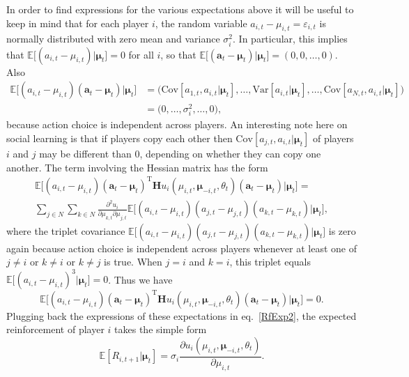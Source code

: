 \documentclass[11pt,reqno]{amsart}
\newcommand{\e}{\theta}
\newcommand{\ac}{a}
\newcommand{\va}{\mathbf{a}}
\newcommand{\Esp}{\mathds{E}}
\newcommand{\np}{N}%
\newcommand{\tm}{t}%
\newcommand{\pf}{u}
\newcommand{\ma}{\mu}
\newcommand{\sd}{\sigma}
\newcommand{\vma}{\boldsymbol{\ma}}
\newcommand{\rf}{R}
\newcommand{\pd}{\partial}
\newcommand{\Hs}{\mathbf{H}}
\newcommand{\var}{\mathrm{Var}}
\newcommand{\cov}{\mathrm{Cov}}
\begin{document}
In order to find expressions for the various expectations above it will be useful to keep in mind that for each player $i$, the random variable $\ac_{i,\tm}- \ma_{i,\tm}=\varepsilon_{i,t}$ is normally distributed with zero mean and variance $\sd_{i}^2$. In particular, this implies that $\Esp \Big[ (\ac_{i,\tm}- \ma_{i,\tm}) \Big| \vma_\tm \Big] = 0$ for all $i$, so that $\Esp \Big[ (\va_\tm  - \vma_\tm) \Big| \vma_\tm \Big] = (0, 0, \dots,0)$. Also
\begin{align}
\label{RfExp3}
\Esp \Big[ (\ac_{i,\tm}- \ma_{i,\tm}) (\va_\tm  - \vma_\tm) \Big| \vma_\tm \Big] & = \Big( \cov[\ac_{1,\tm},\ac_{i,\tm} | \vma_\tm],\dots,\var[\ac_{i,\tm}| \vma_\tm] ,\dots, \cov[\ac_{\np,\tm},\ac_{i,\tm}| \vma_\tm] \Big) \nonumber\\ 
 & = \Big( 0,\dots,\sd_{i}^2,\dots, 0 \Big),
\end{align}
because action choice is independent across players. An interesting note here on social learning is that if players copy each other then $\cov[\ac_{j,\tm},\ac_{i,\tm}| \vma_\tm]$ of players $i$ and $j$ may be different than 0, depending on whether they can copy one another. The term involving the Hessian matrix has the form
\begin{multline}
\label{RfExpH}
\Esp \Big[ (\ac_{i,\tm}- \ma_{i,\tm}) (\va_\tm  - \vma_\tm)^{\textrm{T}} \Hs \pf_{i}(\ma_{i,\tm},\vma_{-i,\tm},\e_\tm) (\va_\tm  - \vma_\tm) \Big| \vma_\tm \Big] = \\
 \sum_{j\in\np} \sum_{k\in\np} \frac{\pd^2 \pf_{i}}{\pd \ma_{k,\tm} \pd \ma_{j,\tm}} \Esp \Big[ (\ac_{i,\tm}- \ma_{i,\tm}) (\ac_{j,\tm}- \ma_{j,\tm}) (\ac_{k,\tm}- \ma_{k,\tm}) \Big| \vma_\tm \Big],
\end{multline}
where the triplet covariance $\Esp \Big[ (\ac_{i,\tm}- \ma_{i,\tm}) (\ac_{j,\tm}- \ma_{j,\tm}) (\ac_{k,\tm}- \ma_{k,\tm}) \Big| \vma_\tm \Big] $ is zero again because action choice is independent across players whenever at least one of  $j\neq i$ or $k\neq i$ or $k\neq j$ is true. When $j=i$ and $k=i$, this triplet equals $\Esp \Big[ (\ac_{i,\tm}- \ma_{i,\tm})^3 \Big| \vma_\tm \Big]=0$. Thus we have
\begin{equation}
\label{RfExpH2}
\Esp \Big[ (\ac_{i,\tm}- \ma_{i,\tm}) (\va_\tm  - \vma_\tm)^{\textrm{T}} \Hs \pf_{i}(\ma_{i,\tm},\vma_{-i,\tm},\e_\tm) (\va_\tm  - \vma_\tm) \Big| \vma_\tm \Big] = 0.
\end{equation}
Plugging back the expressions of these expectations in eq.~\ref{RfExp2}, the expected reinforcement of player $i$ takes the simple form
\begin{equation}
\label{RfExp}
\Esp[\rf_{i,t+1} | \vma_\tm] = \sd_{i}  \frac{\pd \pf_{i}(\ma_{i,\tm},\vma_{-i,\tm},\e_\tm)}{\pd \ma_{i,\tm}}.
\end{equation}
\end{document}

